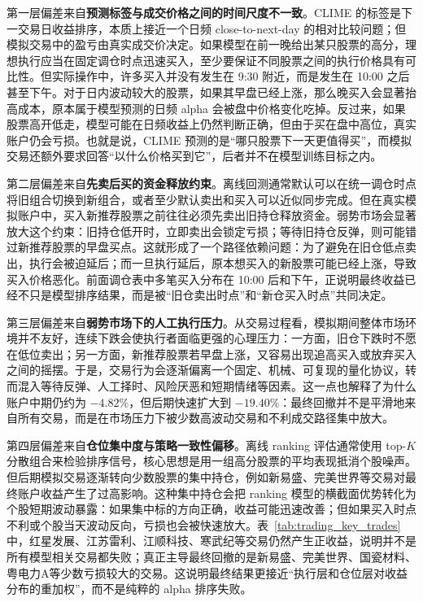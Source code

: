 第一层偏差来自\textbf{预测标签与成交价格之间的时间尺度不一致}。CLIME 的标签是下一交易日收益排序，本质上接近一个日频 close-to-next-day 的相对比较问题；但模拟交易中的盈亏由真实成交价决定。如果模型在前一晚给出某只股票的高分，理想执行应当在固定调仓时点迅速买入，至少要保证不同股票之间的执行价格具有可比性。但实际操作中，许多买入并没有发生在 9:30 附近，而是发生在 10:00 之后甚至下午。对于日内波动较大的股票，如果其早盘已经上涨，那么晚买入会显著抬高成本，原本属于模型预测的日频 alpha 会被盘中价格变化吃掉。反过来，如果股票高开低走，模型可能在日频收益上仍然判断正确，但由于买在盘中高位，真实账户仍会亏损。也就是说，CLIME 预测的是“哪只股票下一天更值得买”，而模拟交易还额外要求回答“以什么价格买到它”，后者并不在模型训练目标之内。

第二层偏差来自\textbf{先卖后买的资金释放约束}。离线回测通常默认可以在统一调仓时点将旧组合切换到新组合，或者至少默认卖出和买入可以近似同步完成。但在真实模拟账户中，买入新推荐股票之前往往必须先卖出旧持仓释放资金。弱势市场会显著放大这个约束：旧持仓低开时，立即卖出会锁定亏损；等待旧持仓反弹，则可能错过新推荐股票的早盘买点。这就形成了一个路径依赖问题：为了避免在旧仓低点卖出，执行会被迫延后；而一旦执行延后，原本想买入的新股票可能已经上涨，导致买入价格恶化。前面调仓表中多笔买入分布在 10:00 后和下午，正说明最终收益已经不只是模型排序结果，而是被“旧仓卖出时点”和“新仓买入时点”共同决定。

第三层偏差来自\textbf{弱势市场下的人工执行压力}。从交易过程看，模拟期间整体市场环境并不友好，连续下跌会使执行者面临更强的心理压力：一方面，旧仓下跌时不愿在低位卖出；另一方面，新推荐股票若早盘上涨，又容易出现追高买入或放弃买入之间的摇摆。于是，交易行为会逐渐偏离一个固定、机械、可复现的量化协议，转而混入等待反弹、人工择时、风险厌恶和短期情绪等因素。这一点也解释了为什么账户中期仍约为 $-4.82\%$，但后期快速扩大到 $-19.40\%$：最终回撤并不是平滑地来自所有交易，而是在市场压力下被少数高波动交易和不利成交路径集中放大。

第四层偏差来自\textbf{仓位集中度与策略一致性偏移}。离线 ranking 评估通常使用 top-$K$ 分散组合来检验排序信号，核心思想是用一组高分股票的平均表现抵消个股噪声。但后期模拟交易逐渐转向少数股票的集中持仓，例如新易盛、完美世界等交易对最终账户收益产生了过高影响。这种集中持仓会把 ranking 模型的横截面优势转化为个股短期波动暴露：如果集中标的方向正确，收益可能迅速改善；但如果买入时点不利或个股当天波动反向，亏损也会被快速放大。表~\ref{tab:trading_key_trades}中，红星发展、江苏雷利、江顺科技、寒武纪等交易仍然产生正收益，说明并不是所有模型相关交易都失败；真正主导最终回撤的是新易盛、完美世界、国瓷材料、粤电力A等少数亏损较大的交易。这说明最终结果更接近“执行层和仓位层对收益分布的重加权”，而不是纯粹的 alpha 排序失败。

